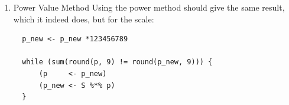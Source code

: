 \documentclass[11pt]{article}
\begin{document}
\begin{enumerate}
\begin{verbatim}
\end{verbatim}

So in this case the stationary point is

\(\langle -0.49, -0.53, -0.49, -0.48, -0.05, -0.05, -0.05, -0.04, -0.04, -0.04 \rangle\)

which can be verified:

$$
1 \vec{p} = S\vec{p}
$$

\begin{verbatim}
  (p     <- eigen(S)$values[1] * eigen(S)$vectors[,1])
\end{verbatim}

\begin{verbatim}
  ##  [1] -0.48531271 -0.52732002 -0.49152601 -0.47977477 -0.05288058 -0.05288058
  ##  [7] -0.05288058 -0.04558671 -0.04558671 -0.04558671
\end{verbatim}

\begin{verbatim}
  (p_new <- S %*% p)
\end{verbatim}

\begin{verbatim}
  ##           [,1]
  ## 1  -0.48531271
  ## 2  -0.52732002
  ## 3  -0.49152601
  ## 4  -0.47977477
  ## 5  -0.05288058
  ## 6  -0.05288058
  ## 7  -0.05288058
  ## 8  -0.04558671
  ## 9  -0.04558671
  ## 10 -0.04558671
\end{verbatim}

However this vector does not sum to 1 so the scale should be adjusted
(for probabilities the vector should sum to 1):

\begin{verbatim}
  (p_new <- p_new/sum(p_new))
\end{verbatim}

\begin{verbatim}
  ##         [,1]
  ## 1  0.2129185
  ## 2  0.2313481
  ## 3  0.2156444
  ## 4  0.2104889
  ## 5  0.0232000
  ## 6  0.0232000
  ## 7  0.0232000
  ## 8  0.0200000
  ## 9  0.0200000
  ## 10 0.0200000
\end{verbatim}

\item Power Value Method
\label{power-value-method}
Using the power method should give the same result, which it indeed
does, but for the scale:

\begin{verbatim}
  p_new <- p_new *123456789

  while (sum(round(p, 9) != round(p_new, 9))) {
      (p     <- p_new)
      (p_new <- S %*% p)
  }


\end{verbatim}
\end{enumerate}
\end{document}
